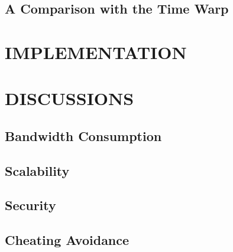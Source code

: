 \documentclass{sigchi}
\begin{document}
\subsection{A Comparison with the Time Warp}






\section{IMPLEMENTATION}
\label{implementation}






\section{DISCUSSIONS}
\label{discussions}

\subsection{Bandwidth Consumption}

\subsection{Scalability}

\subsection{Security}

\subsection{Cheating Avoidance}
\end{document}
